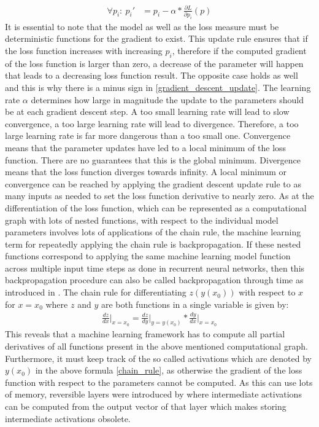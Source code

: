 \documentclass[draft,final]{vutinfth} %
\begin{document}
    \begin{align} 
        \label{gradient_descent_update}
        \forall p_i:~p_i' &= p_i - \alpha * \frac{\partial{L}}{\partial{p_i}}(p)
    \end{align}
    It is essential to note that the model as well as the loss measure must be deterministic functions for the gradient to exist.
    This update rule ensures that if the loss function increases with increasing $p_i$, therefore if the computed gradient of the loss function is larger than zero, a decrease of the parameter will happen that leads to a decreasing loss function result.
    The opposite case holds as well and this is why there is a minus sign in \ref{gradient_descent_update}.
    The learning rate $\alpha$ determines how large in magnitude the update to the parameters should be at each gradient descent step.
    A too small learning rate will lead to slow convergence, a too large learning rate will lead to divergence.
    Therefore, a too large learning rate is far more dangerous than a too small one.
    Convergence means that the parameter updates have led to a local minimum of the loss function.
    There are no guarantees that this is the global minimum. Divergence means that the loss function diverges towards infinity.
    A local minimum or convergence can be reached by applying the gradient descent update rule to as many inputs as needed to set the loss function derivative to nearly zero. 
    As at the differentiation of the loss function, which can be represented as a computational graph with lots of nested functions, with respect to the individual model parameters involves lots of applications of the chain rule, the machine learning term for repeatedly applying the chain rule is backpropagation.
    If these nested functions correspond to applying the same machine learning model function across multiple input time steps as done in recurrent neural networks, then this backpropagation procedure can also be called backpropagation through time as introduced in \cite{GradientDescent}.
    The chain rule for differentiating $z(y(x_0))$ with respect to $x$ for $x=x_0$ where $z$ and $y$ are both functions in a single variable is given by:
    \begin{align}
    \label{chain_rule}
    \frac{dz}{dx} \Bigr\rvert_{x=x_0} = \frac{dz}{dy} \Bigr\rvert_{y=y(x_0)} * \frac{dy}{dx} \Bigr\rvert_{x=x_0}
    \end{align}
    This reveals that a machine learning framework has to compute all partial derivatives of all functions present in the above mentioned computational graph.
    Furthermore, it must keep track of the so called activations which are denoted by $y(x_0)$ in the above formula \ref{chain_rule}, as otherwise the gradient of the loss function with respect to the parameters cannot be computed.
    As this can use lots of memory, reversible layers were introduced by \cite{ReversibleLayer} where intermediate activations can be computed from the output vector of that layer which makes storing intermediate activations obsolete.
\end{document}
